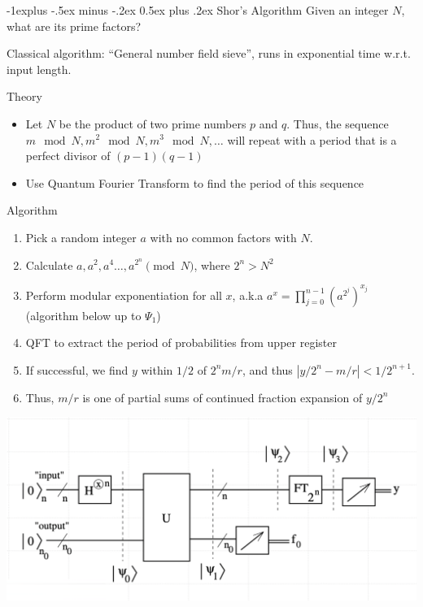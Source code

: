 \documentclass[letterpaper, 8pt]{extarticle}
\makeatletter
\renewcommand{\subsection}{\@startsection{subsection}{2}{0mm}%
                                {-1explus -.5ex minus -.2ex}%
                                {0.5ex plus .2ex}%
                                {\normalfont\small\bfseries}}
\makeatother
\begin{document}
\begin{multicols*}{5}
    \subsection{Shor's Algorithm}
    Given an integer $N$, what are its prime factors?

    Classical algorithm: ``General number field sieve'',
    runs in exponential time w.r.t. input length.

    Theory
    \begin{itemize}
        \item Let $N$ be the product of two prime numbers $p$ and $q$.
              Thus, the sequence $m \mod N, m^2 \mod N, m^3 \mod N, \dots$ will repeat with a period
              that is a perfect divisor of $(p-1)(q-1)$
        \item Use Quantum Fourier Transform to find the period of this sequence
    \end{itemize}

    Algorithm
    \begin{enumerate}
        \item Pick a random integer $a$ with no common factors with $N$.
        \item Calculate $a, a^2, a^4 \dots, a^{2^n} \pmod N$, where $2^n > N^2$
        \item Perform modular exponentiation for all $x$, a.k.a $a^x = \prod_{j=0}^{n-1} (a^{2^j})^{x_j}$
              (algorithm below up to $\Psi_1$)
        \item QFT to extract the period of probabilities from upper register
        \item If successful, we find $y$ within $1/2$ of $2^n m/r$, and thus $|y/2^n - m/r| < 1/2^{n+1}$.
        \item Thus, $m/r$ is one of partial sums of continued fraction expansion of $y/2^n$
    \end{enumerate}

    \includegraphics[width=\linewidth]{Shor.png}


\end{multicols*}
\end{document}
